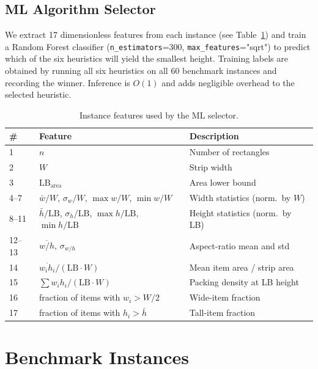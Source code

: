 \documentclass[11pt,a4paper]{article}
\begin{document}
\subsection{ML Algorithm Selector}

We extract 17 dimensionless features from each instance
(see Table~\ref{tab:features}) and train a Random Forest classifier
(\texttt{n\_estimators}=300, \texttt{max\_features}="sqrt") to predict
which of the six heuristics will yield the smallest height.
Training labels are obtained by running all six heuristics on all 60
benchmark instances and recording the winner.
Inference is $O(1)$ and adds negligible overhead to the selected heuristic.

\begin{table}[h]
\centering
\caption{Instance features used by the ML selector.}
\label{tab:features}
\small
\begin{tabular}{lll}
\toprule
\# & Feature & Description \\
\midrule
1  & $n$          & Number of rectangles \\
2  & $W$          & Strip width \\
3  & $\mathrm{LB}_{\text{area}}$ & Area lower bound \\
4--7 & $\bar{w}/W$, $\sigma_w/W$, $\max w/W$, $\min w/W$ & Width statistics (norm.\ by $W$) \\
8--11 & $\bar{h}/\mathrm{LB}$, $\sigma_h/\mathrm{LB}$, $\max h/\mathrm{LB}$, $\min h/\mathrm{LB}$ & Height statistics (norm.\ by LB) \\
12--13 & $\overline{w/h}$, $\sigma_{w/h}$ & Aspect-ratio mean and std \\
14 & $\overline{w_ih_i}/(\mathrm{LB}\cdot W)$ & Mean item area / strip area \\
15 & $\sum w_ih_i / (\mathrm{LB}\cdot W)$ & Packing density at LB height \\
16 & fraction of items with $w_i > W/2$ & Wide-item fraction \\
17 & fraction of items with $h_i > \bar{h}$ & Tall-item fraction \\
\bottomrule
\end{tabular}
\end{table}

\section{Benchmark Instances}
\end{document}
